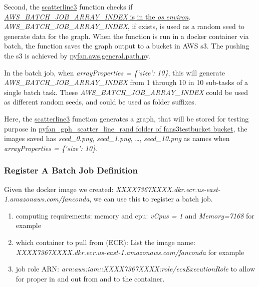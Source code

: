 \documentclass[
]{book}
\providecommand{\tightlist}{%
  \setlength{\itemsep}{0pt}\setlength{\parskip}{0pt}}
\begin{document}
Second, the \href{https://github.com/FanWangEcon/pyfan/blob/master/pyfan/graph/exa/scatterline3.py}{scatterline3} function checks if \href{https://github.com/FanWangEcon/pyfan/blob/master/pyfan/graph/exa/scatterline3.py\#L167}{\emph{AWS\_BATCH\_JOB\_ARRAY\_INDEX} is in the \emph{os.environ}}. \emph{AWS\_BATCH\_JOB\_ARRAY\_INDEX}, if exists, is used as a random seed to generate data for the graph. When the function is run in a docker container via batch, the function saves the graph output to a bucket in AWS s3. The pushing the s3 is achieved by \href{https://github.com/FanWangEcon/pyfan/blob/master/pyfan/aws/general/path.py}{pyfan.aws.general.path.py}.

In the batch job, when \emph{arrayProperties = \{`size': 10\}}, this will generate \emph{AWS\_BATCH\_JOB\_ARRAY\_INDEX} from 1 through 10 in 10 sub-tasks of a single batch task. These \emph{AWS\_BATCH\_JOB\_ARRAY\_INDEX} could be used as different random seeds, and could be used as folder suffixes.

Here, the \href{https://github.com/FanWangEcon/pyfan/blob/master/pyfan/graph/exa/scatterline3.py}{scatterline3} function generates a graph, that will be stored for testing purpose in \href{https://s3.console.aws.amazon.com/s3/buckets/fans3testbucket/pyfan_gph_scatter_line_rand/?region=us-east-1\&tab=overview}{pyfan\_gph\_scatter\_line\_rand folder of fans3testbucket bucket}, the images saved has \emph{seed\_0.png}, \emph{seed\_1.png}, \ldots, \emph{seed\_10.png} as names when \emph{arrayProperties = \{`size': 10\}}.

\hypertarget{register-a-batch-job-definition}{%
\subsubsection{Register A Batch Job Definition}\label{register-a-batch-job-definition}}

Given the docker image we created: \emph{XXXX7367XXXX.dkr.ecr.us-east-1.amazonaws.com/fanconda}, we can use this to register a batch job.

\begin{enumerate}
\def\labelenumi{\arabic{enumi}.}
\tightlist
\item
  computing requirements: memory and cpu: \emph{vCpus = 1} and \emph{Memory=7168} for example
\item
  which container to pull from (ECR): List the image name: \emph{XXXX7367XXXX.dkr.ecr.us-east-1.amazonaws.com/fanconda} for example
\item
  job role ARN: \emph{arn:aws:iam::XXXX7367XXXX:role/ecsExecutionRole} to allow for proper in and out from and to the container.
\end{enumerate}
\end{document}
